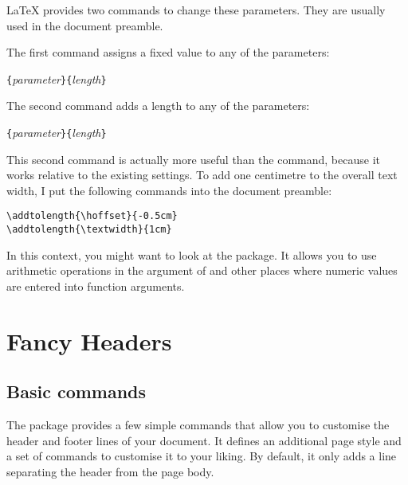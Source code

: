 \LaTeX{} provides two commands to change these parameters. They are
usually used in the document preamble.

The first command assigns a fixed value to any of the parameters:
\begin{lscommand}
  \verb|{|\emph{parameter}\verb|}{|\emph{length}\verb|}|
\end{lscommand}

The second command adds a length to any of the parameters:
\begin{lscommand}
  \verb|{|\emph{parameter}\verb|}{|\emph{length}\verb|}|
\end{lscommand}

This second command is actually more useful than the 
command, because it works relative to the existing settings.
To add one centimetre to the overall text width, I put the
following commands into the document preamble:
\begin{code}
\verb|\addtolength{\hoffset}{-0.5cm}|\\
\verb|\addtolength{\textwidth}{1cm}|
\end{code}

In this context, you might want to look at the  package.
It allows you to use arithmetic operations in the argument of 
and other places where numeric values are entered into function
arguments.

\section{Fancy Headers}\label{sec:fancy}

\subsection{Basic commands}


The  package provides a few simple commands that allow you to
customise the header and footer lines of your document. It defines an
additional page style  and a set of commands to customise it to
your liking. By default, it only adds a line separating the header from the page
body.

